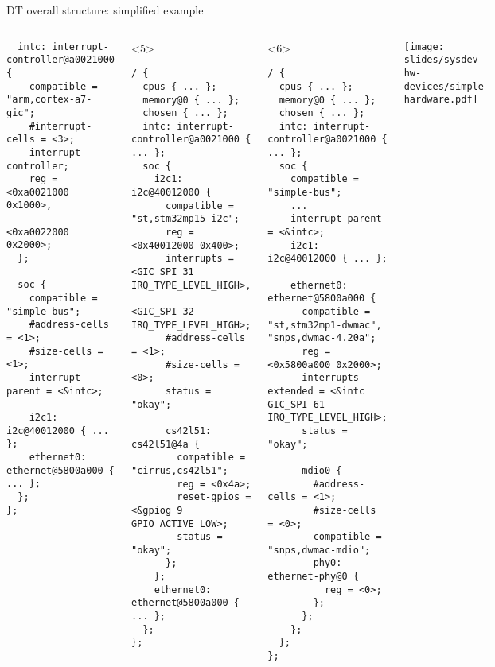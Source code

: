 \begin{frame}[fragile]{DT overall structure: simplified example}
\begin{columns}[T]
\begin{onlyenv}
\begin{block}{}
\begin{verbatim}
  intc: interrupt-controller@a0021000 {
    compatible = "arm,cortex-a7-gic";
    #interrupt-cells = <3>;
    interrupt-controller;
    reg = <0xa0021000 0x1000>,
          <0xa0022000 0x2000>;
  };

  soc {
    compatible = "simple-bus";
    #address-cells = <1>;
    #size-cells = <1>;
    interrupt-parent = <&intc>;

    i2c1: i2c@40012000 { ... };
    ethernet0: ethernet@5800a000 { ... };
  };
};
\end{verbatim}
      \end{block}
    \end{onlyenv}
    \begin{onlyenv}<5>
      \begin{block}{}
\begin{verbatim}
/ {
  cpus { ... };
  memory@0 { ... };
  chosen { ... };
  intc: interrupt-controller@a0021000 { ... };
  soc {
    i2c1: i2c@40012000 {
      compatible = "st,stm32mp15-i2c";
      reg = <0x40012000 0x400>;
      interrupts = <GIC_SPI 31 IRQ_TYPE_LEVEL_HIGH>,
                   <GIC_SPI 32 IRQ_TYPE_LEVEL_HIGH>;
      #address-cells = <1>;
      #size-cells = <0>;
      status = "okay";

      cs42l51: cs42l51@4a {
        compatible = "cirrus,cs42l51";
        reg = <0x4a>;
        reset-gpios = <&gpiog 9 GPIO_ACTIVE_LOW>;
        status = "okay";
      };
    };
    ethernet0: ethernet@5800a000 { ... };
  };
};
\end{verbatim}
      \end{block}
    \end{onlyenv}
    \begin{onlyenv}<6>
      \begin{block}{}
\begin{verbatim}
/ {
  cpus { ... };
  memory@0 { ... };
  chosen { ... };
  intc: interrupt-controller@a0021000 { ... };
  soc {
    compatible = "simple-bus";
    ...
    interrupt-parent = <&intc>;
    i2c1: i2c@40012000 { ... };

    ethernet0: ethernet@5800a000 {
      compatible = "st,stm32mp1-dwmac", "snps,dwmac-4.20a";
      reg = <0x5800a000 0x2000>;
      interrupts-extended = <&intc GIC_SPI 61 IRQ_TYPE_LEVEL_HIGH>;
      status = "okay";

      mdio0 {
        #address-cells = <1>;
        #size-cells = <0>;
        compatible = "snps,dwmac-mdio";
        phy0: ethernet-phy@0 {
          reg = <0>;
        };
      };
    };
  };
};
\end{verbatim}
      \end{block}
    \end{onlyenv}
    \texttt{[image: slides/sysdev-hw-devices/simple-hardware.pdf]}
  \end{columns}
\end{frame}

